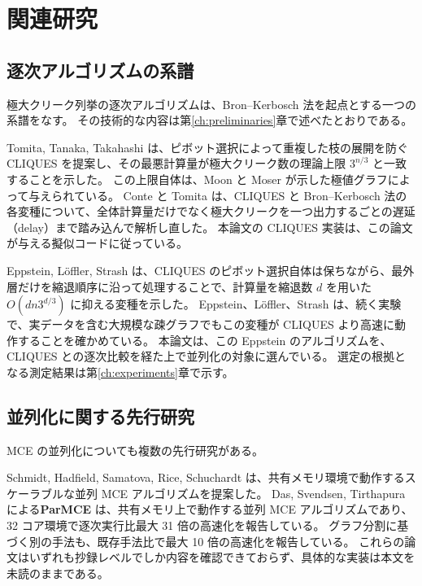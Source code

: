 \chapter{関連研究}
\label{ch:related-work}

\section{逐次アルゴリズムの系譜}
\label{sec:related-sequential}

極大クリーク列挙の逐次アルゴリズムは、Bron--Kerbosch 法を起点とする一つの系譜をなす。
その技術的な内容は第\ref{ch:preliminaries}章で述べたとおりである。

Tomita, Tanaka, Takahashi は、ピボット選択によって重複した枝の展開を防ぐ CLIQUES を提案し、その最悪計算量が極大クリーク数の理論上限 $3^{n/3}$ と一致することを示した\cite{tomita2006}。
この上限自体は、Moon と Moser が示した極値グラフによって与えられている\cite{moon1965}。
Conte と Tomita は、CLIQUES と Bron--Kerbosch 法の各変種について、全体計算量だけでなく極大クリークを一つ出力するごとの遅延（delay）まで踏み込んで解析し直した\cite{conte2022}。
本論文の CLIQUES 実装は、この論文が与える擬似コードに従っている。

Eppstein, L\"offler, Strash は、CLIQUES のピボット選択自体は保ちながら、最外層だけを縮退順序に沿って処理することで、計算量を縮退数 $d$ を用いた $O(d n 3^{d/3})$ に抑える変種を示した\cite{eppstein2010}。
Eppstein、L\"offler、Strash は、続く実験で、実データを含む大規模な疎グラフでもこの変種が CLIQUES より高速に動作することを確かめている\cite{eppstein2013}。
本論文は、この Eppstein のアルゴリズムを、CLIQUES との逐次比較を経た上で並列化の対象に選んでいる。
選定の根拠となる測定結果は第\ref{ch:experiments}章で示す。

\section{並列化に関する先行研究}
\label{sec:related-parallel}

MCE の並列化についても複数の先行研究がある。

Schmidt, Hadfield, Samatova, Rice, Schuchardt は、共有メモリ環境で動作するスケーラブルな並列 MCE アルゴリズムを提案した\cite{schmidt2009}。
Das, Svendsen, Tirthapura による\textbf{ParMCE} は、共有メモリ上で動作する並列 MCE アルゴリズムであり、32 コア環境で逐次実行比最大 31 倍の高速化を報告している\cite{das2018parmce}。
グラフ分割に基づく別の手法も、既存手法比で最大 10 倍の高速化を報告している\cite{jpdc2017kplex}。
これらの論文はいずれも抄録レベルでしか内容を確認できておらず、具体的な実装は本文を未読のままである。

